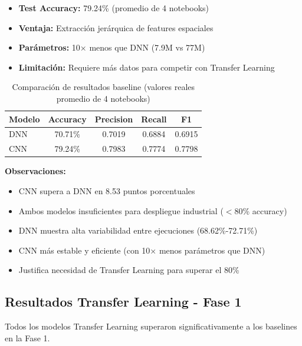 \documentclass[11pt, a4paper]{article}
\begin{document}
\begin{itemize}
    \item \textbf{Test Accuracy:} 79.24\% (promedio de 4 notebooks)
    \item \textbf{Ventaja:} Extracción jerárquica de features espaciales
    \item \textbf{Parámetros:} 10× menos que DNN (7.9M vs 77M)
    \item \textbf{Limitación:} Requiere más datos para competir con Transfer Learning
\end{itemize}

\begin{table}[H]
\centering
\caption{Comparación de resultados baseline (valores reales promedio de 4 notebooks)}
\label{tab:baseline_results}
\begin{tabular}{@{}lcccc@{}}
\toprule
\textbf{Modelo} & \textbf{Accuracy} & \textbf{Precision} & \textbf{Recall} & \textbf{F1} \\
\midrule
DNN    & 70.71\% & 0.7019 & 0.6884 & 0.6915 \\
CNN    & 79.24\% & 0.7983 & 0.7774 & 0.7798 \\
\bottomrule
\end{tabular}
\end{table}

\textbf{Observaciones:}
\begin{itemize}
    \item CNN supera a DNN en 8.53 puntos porcentuales
    \item Ambos modelos insuficientes para despliegue industrial ($<$80\% accuracy)
    \item DNN muestra alta variabilidad entre ejecuciones (68.62\%-72.71\%)
    \item CNN más estable y eficiente (con 10× menos parámetros que DNN)
    \item Justifica necesidad de Transfer Learning para superar el 80\%
\end{itemize}

\subsection{Resultados Transfer Learning - Fase 1}

Todos los modelos Transfer Learning superaron significativamente a los baselines en la Fase 1.
\end{document}
